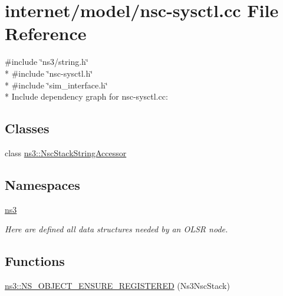 \hypertarget{nsc-sysctl_8cc}{}\section{internet/model/nsc-\/sysctl.cc File Reference}
\label{nsc-sysctl_8cc}
{\ttfamily \#include \char`\"{}ns3/string.\+h\char`\"{}}\\*
{\ttfamily \#include \char`\"{}nsc-\/sysctl.\+h\char`\"{}}\\*
{\ttfamily \#include \char`\"{}sim\+\_\+interface.\+h\char`\"{}}\\*
Include dependency graph for nsc-\/sysctl.cc\+:
\subsection*{Classes}
\begin{DoxyCompactItemize}
\item 
class \hyperlink{classns3_1_1NscStackStringAccessor}{ns3\+::\+Nsc\+Stack\+String\+Accessor}
\end{DoxyCompactItemize}
\subsection*{Namespaces}
\begin{DoxyCompactItemize}
\item 
 \hyperlink{namespacens3}{ns3}
\begin{DoxyCompactList}\small\item\em Here are defined all data structures needed by an O\+L\+SR node. \end{DoxyCompactList}\end{DoxyCompactItemize}
\subsection*{Functions}
\begin{DoxyCompactItemize}
\item 
\hyperlink{namespacens3_a7430d4bf9313307eb1822356e91702e6}{ns3\+::\+N\+S\+\_\+\+O\+B\+J\+E\+C\+T\+\_\+\+E\+N\+S\+U\+R\+E\+\_\+\+R\+E\+G\+I\+S\+T\+E\+R\+ED} (Ns3\+Nsc\+Stack)
\end{DoxyCompactItemize}
